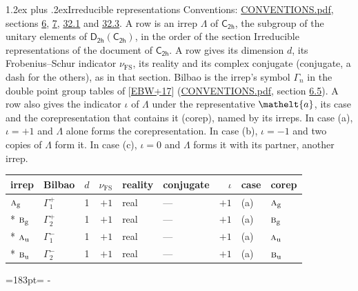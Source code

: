 \documentclass[10pt,a4paper]{article}
\makeatletter
\renewcommand\section{\@startsection{section}{1}{\z@}{-3ex plus -1ex minus -.2ex}%
  {1.2ex plus .2ex}{\normalfont\large\sffamily\bfseries\color{parttitle}}}
\newcommand{\needspace}[1]{\par\penalty-100\begingroup\dimen0=#1\relax\dimen2=\pagegoal
  \advance\dimen2-\pagetotal\ifdim\dimen0>\dimen2\relax\ifdim\dimen2>0pt\vfil\break\fi\fi
  \endgroup}
\numberwithin{equation}{section}
\newcommand{\eltfont}[1]{{\let\sigma\eltsigma\mathelt{#1}}}
\newcommand{\grp}[1]{\mathsf{#1}}
\newcommand{\irr}[1]{\text{\normalfont\scshape #1}}
\newcommand{\elt}[1]{\eltfont{#1}}
\newcommand{\ptag}[1]{\mathrm{#1}}
\newcommand{\fsind}{\nu_{\mathrm{FS}}}
\makeatother
\begin{document}
\section{Irreducible representations}\label{s:irreps}
Conventions: \href{../../CONVENTIONS.pdf}{CONVENTIONS.pdf}, sections \href{../../../rotation/CONVENTIONS.pdf\#conv.6}{6}, \href{../../../rotation/CONVENTIONS.pdf\#conv.7}{7}, \href{../../CONVENTIONS.pdf\#conv.32.1}{32.1} and \href{../../CONVENTIONS.pdf\#conv.32.3}{32.3}.
\leavevmode\label{n:irrep.Delta}A row is an irrep $\Lambda$ of $\grp{C_{2h}}$, the subgroup of the unitary elements of $\grp{D_{2h}}(\grp{C_{2h}})$, in the order of the section Irreducible representations of the document of \href{../../../rotation/data/pdf/C2h.pdf}{$\grp{C_{2h}}$}. \label{n:index.dimension}\label{n:index.frobenius}\label{n:head.irrep}\label{n:head.reality}\label{n:head.conjugate}A row gives its dimension $d$, its Frobenius--Schur indicator $\fsind$, its reality and its complex conjugate (conjugate, a dash for the others), as in that section. \label{n:head.bilbao}\label{n:irrep.alias.gamma}Bilbao is the irrep's symbol $\Gamma_n$ in the double point group tables of [\href{../../../REFERENCES.pdf\#ref.EBW+17}{EBW+17}] (\href{../../CONVENTIONS.pdf}{CONVENTIONS.pdf}, section \href{../../../rotation/CONVENTIONS.pdf\#conv.6.5}{6.5}). \label{n:head.case.corep}\label{n:head.corep}A row also gives the indicator $\iota$ of $\Lambda$ under the representative $\elt{a}$, its case and the corepresentation that contains it (corep), named by its irreps. In case (a), $\iota = +1$ and $\Lambda$ alone forms the corepresentation. In case (b), $\iota = -1$ and two copies of $\Lambda$ form it. In case (c), $\iota = 0$ and $\Lambda$ forms it with its partner, another irrep.
\setlength{\emergencystretch}{2em}\par\setlength{\emergencystretch}{0pt}
{\small\renewcommand{\arraystretch}{1.25}\setlength{\tabcolsep}{4pt}\begin{longtable}{@{}llrrllrll@{}}\toprule
irrep & Bilbao & $d$ & $\fsind$ & reality & conjugate & $\iota$ & case & corep\\\midrule\endhead
\bottomrule\endfoot\endlastfoot
$\irr{a}_{\ptag{g}}$ & $\Gamma_{1}^{+}$ & 1 & $+1$ & real & --- & $+1$ & (a) & $\irr{a}_{\ptag{g}}$\\*
$\irr{b}_{\ptag{g}}$ & $\Gamma_{2}^{+}$ & 1 & $+1$ & real & --- & $+1$ & (a) & $\irr{b}_{\ptag{g}}$\\*
$\irr{a}_{\ptag{u}}$ & $\Gamma_{1}^{-}$ & 1 & $+1$ & real & --- & $+1$ & (a) & $\irr{a}_{\ptag{u}}$\\*
$\irr{b}_{\ptag{u}}$ & $\Gamma_{2}^{-}$ & 1 & $+1$ & real & --- & $+1$ & (a) & $\irr{b}_{\ptag{u}}$\\
\bottomrule\end{longtable}}
\needspace{183pt}
\end{document}
